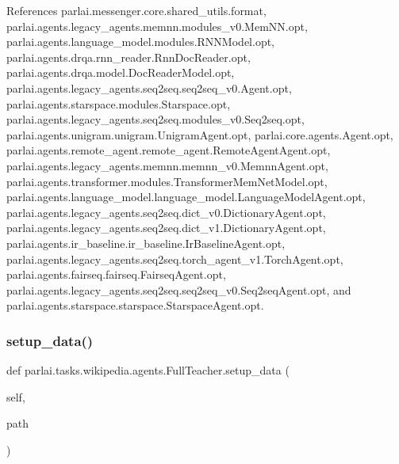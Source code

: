 References parlai.\+messenger.\+core.\+shared\+\_\+utils.\+format, parlai.\+agents.\+legacy\+\_\+agents.\+memnn.\+modules\+\_\+v0.\+Mem\+N\+N.\+opt, parlai.\+agents.\+language\+\_\+model.\+modules.\+R\+N\+N\+Model.\+opt, parlai.\+agents.\+drqa.\+rnn\+\_\+reader.\+Rnn\+Doc\+Reader.\+opt, parlai.\+agents.\+drqa.\+model.\+Doc\+Reader\+Model.\+opt, parlai.\+agents.\+legacy\+\_\+agents.\+seq2seq.\+seq2seq\+\_\+v0.\+Agent.\+opt, parlai.\+agents.\+starspace.\+modules.\+Starspace.\+opt, parlai.\+agents.\+legacy\+\_\+agents.\+seq2seq.\+modules\+\_\+v0.\+Seq2seq.\+opt, parlai.\+agents.\+unigram.\+unigram.\+Unigram\+Agent.\+opt, parlai.\+core.\+agents.\+Agent.\+opt, parlai.\+agents.\+remote\+\_\+agent.\+remote\+\_\+agent.\+Remote\+Agent\+Agent.\+opt, parlai.\+agents.\+legacy\+\_\+agents.\+memnn.\+memnn\+\_\+v0.\+Memnn\+Agent.\+opt, parlai.\+agents.\+transformer.\+modules.\+Transformer\+Mem\+Net\+Model.\+opt, parlai.\+agents.\+language\+\_\+model.\+language\+\_\+model.\+Language\+Model\+Agent.\+opt, parlai.\+agents.\+legacy\+\_\+agents.\+seq2seq.\+dict\+\_\+v0.\+Dictionary\+Agent.\+opt, parlai.\+agents.\+legacy\+\_\+agents.\+seq2seq.\+dict\+\_\+v1.\+Dictionary\+Agent.\+opt, parlai.\+agents.\+ir\+\_\+baseline.\+ir\+\_\+baseline.\+Ir\+Baseline\+Agent.\+opt, parlai.\+agents.\+legacy\+\_\+agents.\+seq2seq.\+torch\+\_\+agent\+\_\+v1.\+Torch\+Agent.\+opt, parlai.\+agents.\+fairseq.\+fairseq.\+Fairseq\+Agent.\+opt, parlai.\+agents.\+legacy\+\_\+agents.\+seq2seq.\+seq2seq\+\_\+v0.\+Seq2seq\+Agent.\+opt, and parlai.\+agents.\+starspace.\+starspace.\+Starspace\+Agent.\+opt.

\mbox{\label{classparlai_1_1tasks_1_1wikipedia_1_1agents_1_1FullTeacher_a969b628c85be8be59009ef29fb0855fc}} 
\subsubsection{\texorpdfstring{setup\+\_\+data()}{setup\_data()}}
{\footnotesize\ttfamily def parlai.\+tasks.\+wikipedia.\+agents.\+Full\+Teacher.\+setup\+\_\+data (\begin{DoxyParamCaption}\item[{}]{self,  }\item[{}]{path }\end{DoxyParamCaption})}




